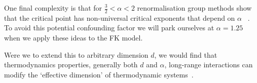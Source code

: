 One final complexity is that for \(\tfrac{3}{2} < \alpha < 2\) renormalisation group methods show that the critical point has non-universal critical exponents that depend on \(\alpha\) ~\autocite{fisherCriticalExponentsLongRange1972}. To avoid this potential confounding factor we will park ourselves at \(\alpha = 1.25\) when we apply these ideas to the FK model.

Were we to extend this to arbitrary dimension \(d\), we would find that thermodynamics properties, generally both \(d\) and \(\alpha\), long-range interactions can modify the `effective dimension' of thermodynamic systems~\autocite{angeliniRelationsShortrangeLongrange2014}.
